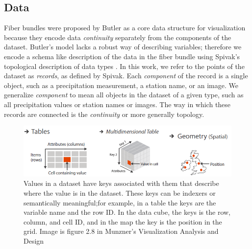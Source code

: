 \documentclass[../main.tex]{subfiles}
\begin{document}
\subsection{Data}
\label{sec:intro_data}
Fiber bundles were proposed by Butler as a core data structure for visualization because they encode data \textit{continuity} separately from the components of the dataset\cite{butlerVisualizationModelBased1989,butlerVectorBundleClassesForm1992}. Butler's model lacks a robust way of describing variables; therefore we encode a schema like description of the data in the fiber bundle using Spivak's topological description of data types \cite{spivakDatabasesAreCategories2010,spivakSIMPLICIALDATABASES}. In this work, we refer to the points of the dataset as \textit{records}, as defined by Spivak. Each \textit{component} of the record is a single object, such as a precipitation measurement, a station name, or an image. We generalize \textit{component} to mean all objects in the dataset of a given type, such as all precipitation values or station names or images. The way in which these records are connected is the \textit{continuity} or more generally topology.

\begin{figure}[H]
    \includegraphics[width=1\textwidth]{figures/intro/munzner_datatypes.png}
    \caption{Values in a dataset have keys associated with them that describe where the value is in the dataset. These keys can be indexers or semantically meaningful;for example, in a table the keys are the variable name and the row ID. In the data cube,  the keys is the row, column, and cell ID, and in the map the key is the position in the grid. Image is figure 2.8 in Munzner's Visualization Analysis and Design\cite{munznerVisualizationAnalysisDesign2014}}
    \label{fig:intro:keys:values}
\end{figure}
\end{document}

